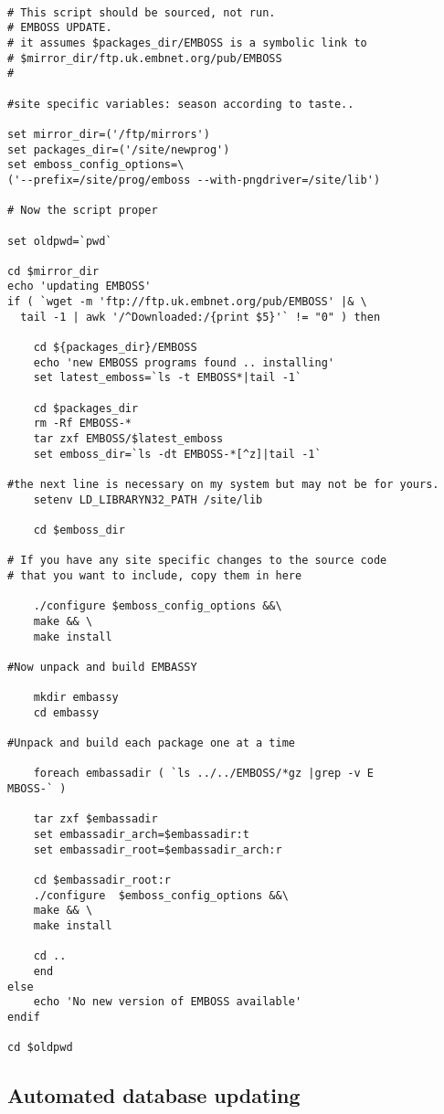 \documentclass{report}
\begin{document}
\begin{verbatim}

# This script should be sourced, not run.
# EMBOSS UPDATE.
# it assumes $packages_dir/EMBOSS is a symbolic link to 
# $mirror_dir/ftp.uk.embnet.org/pub/EMBOSS
#

#site specific variables: season according to taste..

set mirror_dir=('/ftp/mirrors')
set packages_dir=('/site/newprog')
set emboss_config_options=\
('--prefix=/site/prog/emboss --with-pngdriver=/site/lib')

# Now the script proper

set oldpwd=`pwd`

cd $mirror_dir
echo 'updating EMBOSS'
if ( `wget -m 'ftp://ftp.uk.embnet.org/pub/EMBOSS' |& \
  tail -1 | awk '/^Downloaded:/{print $5}'` != "0" ) then 

    cd ${packages_dir}/EMBOSS
    echo 'new EMBOSS programs found .. installing'
    set latest_emboss=`ls -t EMBOSS*|tail -1`

    cd $packages_dir
    rm -Rf EMBOSS-*
    tar zxf EMBOSS/$latest_emboss
    set emboss_dir=`ls -dt EMBOSS-*[^z]|tail -1`

#the next line is necessary on my system but may not be for yours.
    setenv LD_LIBRARYN32_PATH /site/lib

    cd $emboss_dir

# If you have any site specific changes to the source code 
# that you want to include, copy them in here

    ./configure $emboss_config_options &&\
    make && \
    make install

#Now unpack and build EMBASSY

    mkdir embassy
    cd embassy

#Unpack and build each package one at a time

    foreach embassadir ( `ls ../../EMBOSS/*gz |grep -v E
MBOSS-` )

	tar zxf $embassadir
	set embassadir_arch=$embassadir:t
	set embassadir_root=$embassadir_arch:r

	cd $embassadir_root:r
	./configure  $emboss_config_options &&\
	make && \
	make install

	cd ..
    end
else
    echo 'No new version of EMBOSS available'
endif

cd $oldpwd
\end{verbatim} 

\subsection{Automated database updating}
\end{document}
